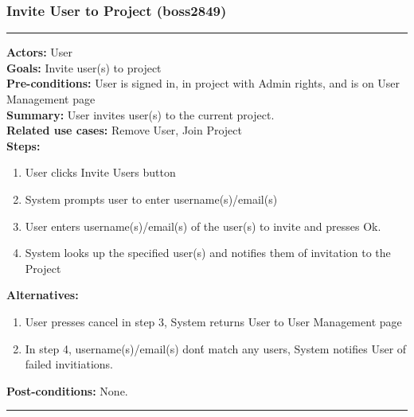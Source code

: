 \documentclass[11pt]{report}
\begin{document}
\subsubsection{Invite User to Project  (boss2849)}
\vspace{2pt}
\hrule
\vspace{8pt}
 \textbf{Actors:} User \\ 
 \textbf{Goals:} Invite user(s) to project \\
 \textbf{Pre-conditions:} User is signed in, in project with Admin rights, and is on User Management page \\
 \textbf{Summary:} User invites user(s) to the current project. \\ 
 \textbf{Related use cases:} Remove User, Join Project \\ 
 \textbf{Steps:} \begin{enumerate}
  \item User clicks Invite Users button
  \item System prompts user to enter username(s)/email(s)
  \item User enters username(s)/email(s) of the user(s) to invite and presses Ok.
  \item System looks up the specified user(s) and notifies them of invitation to the Project
 \end{enumerate}
 \textbf{Alternatives:} \begin{enumerate}
  \item User presses cancel in step 3, System returns User to User Management page
  \item In step 4, username(s)/email(s) don\'t match any users, System notifies User of failed invitiations.
 \end{enumerate} 
 \textbf{Post-conditions:} None. \\
 \vspace{8pt}
\hrule
\newpage
\end{document}
